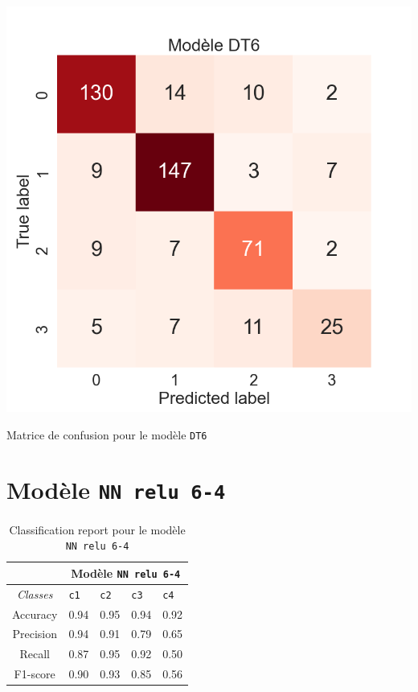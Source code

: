 \begin{table}[H]
    \includegraphics[scale=0.5]{images/y_pred_DT6.png}
    \caption{\label{HomePage} Matrice de confusion pour le modèle \texttt{DT6}}
\end{table}

\newpage

\section{Modèle \texttt{NN relu 6-4}}

\begin{table}[ht]
  \begin{tabular}{ m{5em} | m{1cm}| m{1cm} | m{1cm}| m{1cm} | } 
  \cline{2-5}
             & \multicolumn{4}{|c|}{Modèle \texttt{NN relu 6-4}}\\
 \hline
 \multicolumn{1}{|c|}{\textit{Classes}} & \hfil \texttt{c1} & \hfil \texttt{c2} & \hfil \texttt{c3} & \hfil \texttt{c4} \\ 
  \hline
  \multicolumn{1}{|c|}{Accuracy} & \hfil 0.94 & \hfil 0.95 & \hfil 0.94 & \hfil 0.92 \\ 
  \hline
  \multicolumn{1}{|c|}{Precision} & \hfil 0.94 & \hfil 0.91 & \hfil 0.79 & \hfil 0.65 \\ 
  \hline
  \multicolumn{1}{|c|}{Recall} & \hfil 0.87 & \hfil 0.95 & \hfil 0.92 & \hfil 0.50 \\ 
  \hline
  \multicolumn{1}{|c|}{F1-score} & \hfil 0.90 & \hfil 0.93 & \hfil 0.85 & \hfil 0.56 \\ 
  \hline
\end{tabular}
\caption{Classification report pour le modèle \texttt{NN relu 6-4}}
  \label{Tab:Tcr}
\end{table}

